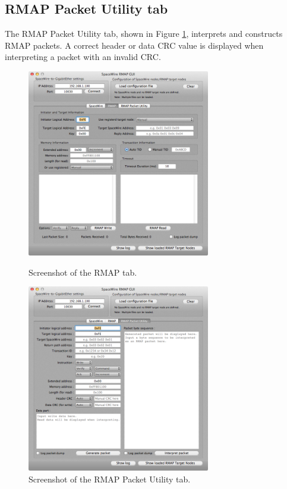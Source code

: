 \documentclass[a4paper,10pt]{article}
\begin{document}
\subsection{RMAP Packet Utility tab}
The RMAP Packet Utility tab, shown in Figure \ref{figure:RMAPPacketUtilityTab}, interprets and constructs RMAP packets.
A correct header or data CRC value is displayed when interpreting a packet with an invalid CRC.

\begin{figure}[htb]
\begin{center}
\begin{minipage}{0.45\hsize}
\begin{center}
\includegraphics[width=8cm]{figures/SpaceWireRMAPGUI/Screenshot_RMAPTab.png}
\caption{Screenshot of the RMAP tab.}
\label{figure:SpaceWireTab}
\end{center}
\end{minipage}
\hspace{0.05\hsize}
\begin{minipage}{0.45\hsize}
\begin{center}
\includegraphics[width=8cm]{figures/SpaceWireRMAPGUI/Screenshot_RMAPPacketUtilityTab.png}
\caption{Screenshot of the RMAP Packet Utility tab.}
\label{figure:RMAPPacketUtilityTab}
\end{center}
\end{minipage}
\end{center}
\end{figure}
\end{document}
